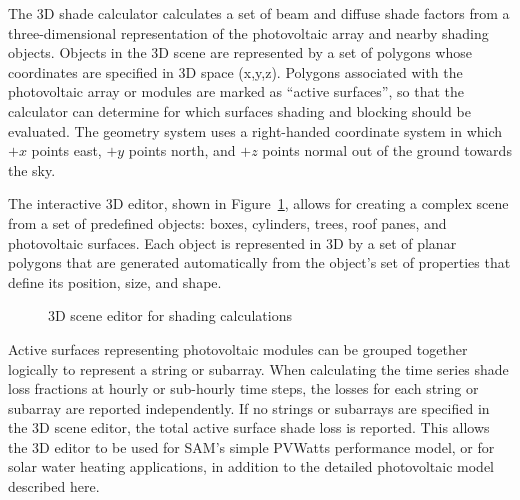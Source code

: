 \documentclass[12pt,letterpaper]{article}
\begin{document}
The 3D shade calculator calculates a set of beam and diffuse shade factors from a three-dimensional representation of the photovoltaic array and nearby shading objects. Objects in the 3D scene are represented by a set of polygons whose coordinates are specified in 3D space (x,y,z).  Polygons associated with the photovoltaic array or modules are marked as ``active surfaces'', so that the calculator can determine for which surfaces shading and blocking should be evaluated.  The geometry system uses a right-handed coordinate system in which $+x$ points east, $+y$ points north, and $+z$ points normal out of the ground towards the sky. 

The interactive 3D editor, shown in Figure~\ref{fig:3dscene}, allows for creating a complex scene from a set of predefined objects: boxes, cylinders, trees, roof panes, and photovoltaic surfaces.  Each object is represented in 3D by a set of planar polygons that are generated automatically from the object's set of properties that define its position, size, and shape.  

\begin{figure}
\begin{center}
\caption{3D scene editor for shading calculations}
\label{fig:3dscene}
\end{center}
\end{figure}

Active surfaces representing photovoltaic modules can be grouped together logically to represent a string or subarray.  When calculating the time series shade loss fractions at hourly or sub-hourly time steps, the losses for each string or subarray are reported independently.  If no strings or subarrays are specified in the 3D scene editor, the total active surface shade loss is reported.  This allows the 3D editor to be used for SAM's simple PVWatts performance model, or for solar water heating applications, in addition to the detailed photovoltaic model described here.
\end{document}
